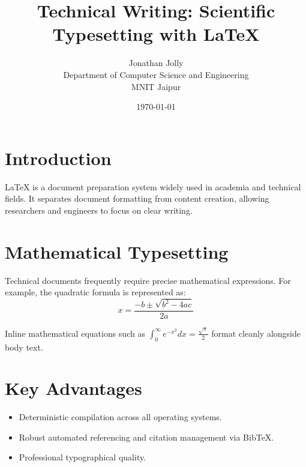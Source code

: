 \documentclass[11pt,a4paper]{article}
\title{\textbf{Technical Writing: Scientific Typesetting with \LaTeX}}
\author{Jonathan Jolly \\ Department of Computer Science and Engineering \\ MNIT Jaipur}
\date{\today}
\begin{document}
\maketitle

\section{Introduction}
\LaTeX{} is a document preparation system widely used in academia and technical fields. It separates document formatting from content creation, allowing researchers and engineers to focus on clear writing.

\section{Mathematical Typesetting}
Technical documents frequently require precise mathematical expressions. For example, the quadratic formula is represented as:
\begin{equation}
x = \frac{-b \pm \sqrt{b^2 - 4ac}}{2a}
\end{equation}

Inline mathematical equations such as $\int_{0}^{\infty} e^{-x^2} dx = \frac{\sqrt{\pi}}{2}$ format cleanly alongside body text.

\section{Key Advantages}
\begin{itemize}
    \item Deterministic compilation across all operating systems.
    \item Robust automated referencing and citation management via Bib\TeX.
    \item Professional typographical quality.
\end{itemize}
\end{document}
